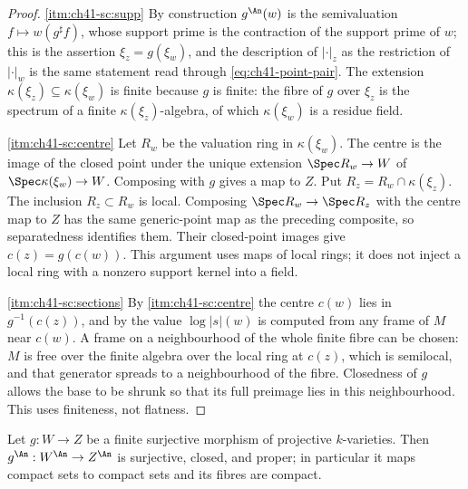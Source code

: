 \begin{proof}
\cref{itm:ch41-sc:supp}  By construction $g^{\An}(w)$ is the semivaluation
$f\mapsto w(g^\sharp f)$, whose support prime is the contraction of the
support prime of $w$; this is the assertion $\xi_z=g(\xi_w)$, and the
description of $|\cdot|_z$ as the restriction of $|\cdot|_w$ is the same
statement read through \eqref{eq:ch41-point-pair}.  The extension
$\kappa(\xi_z)\subseteq\kappa(\xi_w)$ is finite because $g$ is finite:
the fibre of $g$ over $\xi_z$ is the spectrum of a finite
$\kappa(\xi_z)$-algebra, of which $\kappa(\xi_w)$ is a residue field.

\cref{itm:ch41-sc:centre}  Let $R_w$ be the valuation ring in
$\kappa(\xi_w)$.  The centre is the image of the closed point under
the unique extension $\Spec R_w\to W$ of $\Spec\kappa(\xi_w)\to W$.
Composing with $g$ gives a map to $Z$.  Put
$R_z=R_w\cap\kappa(\xi_z)$.  The inclusion $R_z\subset R_w$ is
local.  Composing $\Spec R_w\to\Spec R_z$ with the centre map to $Z$
has the same generic-point map as the preceding composite, so
separatedness identifies them.  Their closed-point images give
$c(z)=g(c(w))$.  This argument uses maps of local rings; it does not
inject a local ring with a nonzero support kernel into a field.

\cref{itm:ch41-sc:sections}  By \cref{itm:ch41-sc:centre} the centre $c(w)$
lies in $g^{-1}(c(z))$, and by  the
value $\log|s|(w)$ is computed from any frame of $M$ near $c(w)$.
A frame on a neighbourhood of the whole finite fibre can be chosen:
$M$ is free over the finite algebra over the local ring at $c(z)$,
which is semilocal, and that generator spreads to a neighbourhood of
the fibre.  Closedness of $g$ allows the base to be shrunk so that its
full preimage lies in this neighbourhood.  This uses finiteness,
not flatness.
\end{proof}

\begin{lemma}
\label{lem:ch41-finite-surjective}
Let $g:W\to Z$ be a finite surjective morphism of projective
$k$-varieties.  Then $g^{\An}:W^{\An}\to Z^{\An}$ is surjective, closed,
and proper; in particular it maps compact sets to compact sets and its
fibres are compact.
\end{lemma}


